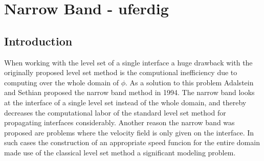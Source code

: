 \chapter{Narrow Band - uferdig}
\section{Introduction}
When working with the level set of a single interface a huge drawback with the originally proposed level set method is the computional inefficiency due to computing over the whole domain of \(\phi\). As a solution to this problem Adalstein and Sethian proposed the narrow band method in 1994\cite{adalsteinsson94}. The narrow band looks at the interface of a single level set instead of the whole domain, and thereby decreases the computational labor of the standard level set method for propagating interfaces considerably. Another reason the narrow band was proposed are problems where the velocity field is only given on the interface. In such cases the construction of an appropriate speed funcion for the entire domain made use of the classical level set method a significant modeling problem.

